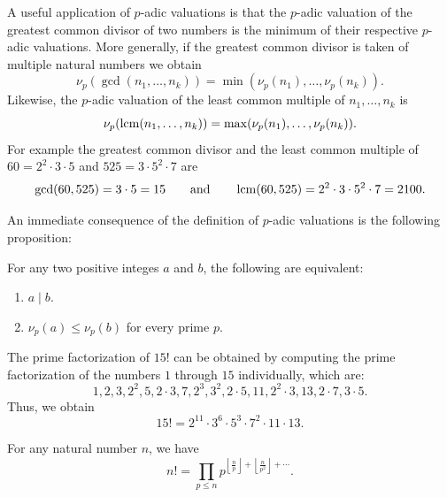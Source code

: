 \begin{example}
  A useful application of $p$-adic valuations is that the $p$-adic valuation of the greatest common divisor of two numbers is the minimum of their respective $p$-adic valuations. More generally, if the greatest common divisor is taken of multiple natural numbers we obtain
  \begin{equation*}
    \nu_p(\gcd(n_1,\ldots,n_k))=\min(\nu_p(n_1),\ldots,\nu_p(n_k)).
  \end{equation*}
  Likewise, the $p$-adic valuation of the least common multiple of $n_1,\ldots,n_k$ is
  \begin{equation*}
    \nu_p(\operatorname*{lcm}(n_1,\ldots,n_k))=\max(\nu_p(n_1),\ldots,\nu_p(n_k)).
  \end{equation*}
  For example the greatest common divisor and the least common multiple of $60=2^2\cdot 3\cdot 5$ and $525=3\cdot 5^2\cdot 7$ are
  \begin{equation*}
    \gcd(60,525)=3\cdot 5=15\qquad\text{and}\qquad\operatorname*{lcm}(60,525)=2^2\cdot 3\cdot 5^2\cdot 7=2100.
  \end{equation*}  
\end{example}

An immediate consequence of the definition of $p$-adic valuations is the following proposition:

\begin{proposition}
  For any two positive integes $a$ and $b$, the following are equivalent:
  \begin{enumerate}
  \item $a\mid b$.
  \item $\nu_p(a)\leq\nu_p(b)$ for every prime $p$.
  \end{enumerate}
\end{proposition}

\begin{example}\label{example:15!}
  The prime factorization of $15!$ can be obtained by computing the prime factorization of the numbers $1$ through $15$ individually, which are:
  \begin{equation*}
    1,2,3,2^2,5,2\cdot 3,7,2^3,3^2,2\cdot 5,11,2^2\cdot 3,13,2\cdot 7,3\cdot 5.
  \end{equation*}
  Thus, we obtain
  \begin{equation*}
    15!=2^{11}\cdot 3^6\cdot 5^3\cdot 7^2 \cdot 11\cdot 13.
  \end{equation*}
\end{example}

\begin{theorem}\label{theorem:legendres-formula}
  For any natural number $n$, we have
  \begin{equation*}
    n!=\prod_{p\leq n}p^{\left\lfloor\frac{n}{p}\right\rfloor + \left\lfloor\frac{n}{p^2}\right\rfloor + \cdots}.
  \end{equation*}
\end{theorem}


